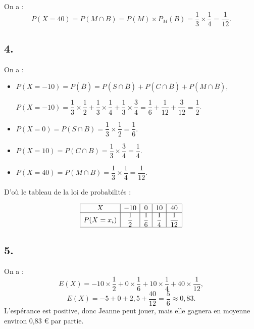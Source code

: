 On a :
\[
P(X = 40) = P(M \cap B) = P(M) \times P_M(B) = \dfrac{1}{3} \times \dfrac{1}{4} = \dfrac{1}{12}.
\]

\subsection*{4.}

On a :
\begin{itemize}
    \item
    \(P(X = -10) = P(\overline{B}) = P(S \cap \overline{B}) + P(C \cap \overline{B}) + P(M \cap \overline{B})\),

\(P(X = -10) = \dfrac{1}{3} \times \dfrac{1}{2} + \dfrac{1}{3} \times \dfrac{1}{4} + \dfrac{1}{3} \times \dfrac{3}{4} = \dfrac{1}{6} + \dfrac{1}{12} + \dfrac{3}{12} = \dfrac{1}{2}\).
    \item \(P(X = 0) = P(S \cap B) = \dfrac{1}{3} \times \dfrac{1}{2} = \dfrac{1}{6}\).
    \item \(P(X = 10) = P(C \cap B) = \dfrac{1}{3} \times \dfrac{3}{4} = \dfrac{1}{4}\).
    \item \(P(X = 40) = P(M \cap B) = \dfrac{1}{3} \times \dfrac{1}{4} = \dfrac{1}{12}\).
\end{itemize}

D'où le tableau de la loi de probabilités :

\[
\begin{array}{|c|c|c|c|c|}
\hline
X & -10 & 0 & 10 & 40 \\
\hline
P(X = x_i) & \dfrac{1}{2} & \dfrac{1}{6} & \dfrac{1}{4} & \dfrac{1}{12} \\
\hline
\end{array}
\]

\subsection*{5.}

On a :
\[
E(X) = -10 \times \dfrac{1}{2} + 0 \times \dfrac{1}{6} + 10 \times \dfrac{1}{4} + 40 \times \dfrac{1}{12},
\]
\[
E(X) = -5 + 0 + 2,5 + \dfrac{40}{12} = \dfrac{5}{6} \approx 0,83.
\]
L'espérance est positive, donc Jeanne peut jouer, mais elle gagnera en moyenne environ 0,83 € par partie.
